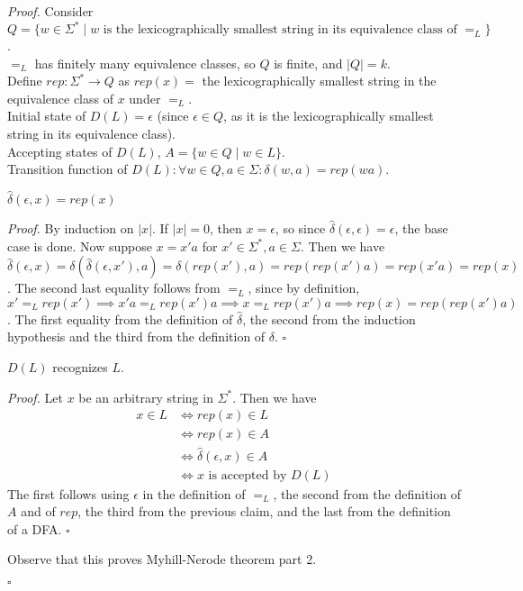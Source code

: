 \documentclass[a4paper]{article}
\newenvironment{proof}{\begin{breakbox}\textit{Proof.}}{\hfill$\square$\end{breakbox}}
\newcommand{\nl}{\vspace{0.2cm}\\}
\newcommand{\hd}{\hat{\delta}}
\begin{document}
\begin{proof}
    Consider $Q = \{w \in \Sigma^* \mid w \text{ is the lexicographically smallest string in its equivalence class of }=_L\}$.\nl
    $=_L$ has finitely many equivalence classes, so $Q$ is finite, and $|Q| = k$.\nl
    Define $rep : \Sigma^* \to Q$ as $rep(x) = $ the lexicographically smallest string in the equivalence class of $x$ under $=_L$.\nl
    Initial state of $D(L) = \epsilon$ (since $\epsilon \in Q$, as it is the lexicographically smallest string in its equivalence class).\nl
    Accepting states of $D(L)$, $A = \{w \in Q \mid w \in L\}$.\nl
    Transition function of $D(L) : \forall w \in Q, a \in \Sigma : \delta(w, a) = rep(wa)$.\nl

    \begin{claim}
        $\hd(\epsilon, x) = rep(x)$
    \end{claim}

    \begin{proof}
        By induction on $|x|$. If $|x| = 0$, then $x = \epsilon$, so since $\hd(\epsilon, \epsilon) = \epsilon$, the base case is done.
        Now suppose $x = x'a$ for $x' \in \Sigma^*, a \in \Sigma$. Then we have $\hd(\epsilon, x) = \delta(\hd(\epsilon, x'), a) = \delta(rep(x'), a) = rep(rep(x')a) = rep(x'a) = rep(x)$. The
        second last equality follows from $=_L$, since by definition, $x' =_L rep(x') \implies x'a =_L rep(x')a \implies x =_L rep(x')a \implies rep(x) = rep(rep(x')a)$.
        The first equality from the definition of $\hd$, the second from the induction hypothesis and the third from the definition of $\delta$.
    \end{proof}

    \begin{claim}
        $D(L)$ recognizes $L$.
    \end{claim}

    \begin{proof}
        Let $x$ be an arbitrary string in $\Sigma^*$. Then we have
        \begin{align*}
            x \in L &\iff rep(x) \in L\\
                    &\iff rep(x) \in A\\
                    &\iff \hd(\epsilon, x) \in A\\
                    &\iff x \text{ is accepted by } D(L)
        \end{align*}
        The first follows using $\epsilon$ in the definition of $=_L$, the second from the definition of $A$ and of $rep$, the third from the previous claim, and the last from the
        definition of a DFA.
    \end{proof}

    Observe that this proves Myhill-Nerode theorem part 2.

\end{proof}
\end{document}
